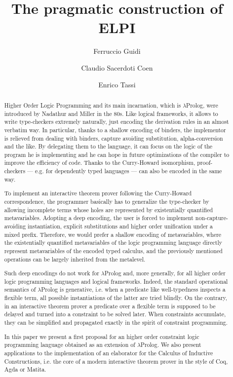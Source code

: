 \documentclass{easychair}
\title{The pragmatic construction of ELPI}
\author{Ferruccio Guidi \and Claudio Sacerdoti Coen \and Enrico Tassi}
\institute{
  Department of Computer Science and Engineering, University of Bologna \email{ferruccio.guidi@unibo.it} \and
  Department of Computer Scienc and Engineeringe, University of Bologna \email{claudio.sacerdoticoen@unibo.it} \and
  Inria Sophia-Antipolis, \email{Enrico.Tassi@inria.fr}}
\begin{document}
\maketitle

\begin{abstract}
Higher Order Logic Programming and its main incarnation, which is $\lambda$Prolog, were introduced by Nadathur and Miller in the 80s. Like logical frameworks, it allows to write type-checkers extremely naturally, just encoding the derivation rules in an almost verbatim way. In particular, thanks to a shallow encoding of binders, the implementor is relieved from dealing with binders, capture avoiding substitution, alpha-conversion and the like. By delegating them to the language, it can focus on the logic of the program he is implementing and he can hope in future optimizations of the compiler to improve the efficiency of code. Thanks to the Curry-Howard isomorphism, proof-checkers --- e.g. for dependently typed languages --- can also be encoded in the same way.

To implement an interactive theorem prover following the Curry-Howard correspondence, the programmer basically has to generalize the type-checker by allowing incomplete terms whose holes are represented by existentially quantified metavariables. Adopting a deep encoding, the user is forced to implement non-capture-avoiding instantiation, explicit substitutions and higher order unification under a mixed prefix. Therefore, we would prefer a shallow encoding of metavariables, where the existentially quantified metavariables of the logic programming language directly represent metavariables of the encoded typed calculus, and the previously mentioned operations can be largely inherited from the metalevel.

Such deep encodings do not work for $\lambda$Prolog and, more generally, for all higher order logic programming languages and logical frameworks. Indeed, the standard operational semantics of $\lambda$Prolog is generative, i.e. when a predicate like well-typedness inspects a flexible term, all possible instantiations of the latter are tried blindly. On the contrary, in an interactive theorem prover a predicate over a flexible term is supposed to be delayed and turned into a constraint to be solved later. When constraints accumulate, they can be simplified and propagated exactly in the spirit of constraint programming.

In this paper we present a first proposal for an higher order constraint logic
programming language obtained as an extension of $\lambda$Prolog. We also present
applications to the implementation of an elaborator for the Calculus of
Inductive Constructions, i.e. the core of a modern interactive theorem prover
in the style of Coq, Agda or Matita.
\end{abstract}
\end{document}
